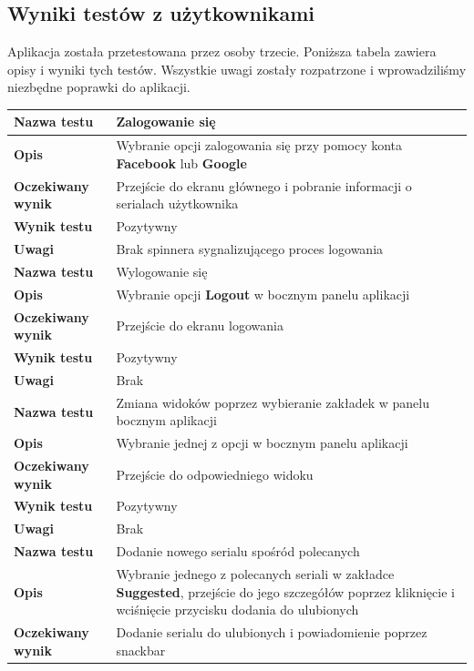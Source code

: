\documentclass[10pt,a4paper]{article}
\begin{document}
\subsection{Wyniki testów z użytkownikami}
Aplikacja została przetestowana przez osoby trzecie. Poniższa tabela zawiera opisy i wyniki tych testów. Wszystkie uwagi zostały rozpatrzone i wprowadziliśmy niezbędne poprawki do aplikacji.

\begin{tabularx}{\textwidth}{|l|X|}
	\hline
	\textbf{Nazwa testu} & Zalogowanie się \\
	\hline
	\textbf{Opis} & Wybranie opcji zalogowania się przy pomocy konta \textbf{Facebook} lub \textbf{Google} \\
	\hline
	\textbf{Oczekiwany wynik} & Przejście do ekranu głównego i pobranie informacji o serialach użytkownika \\
	\hline
	\textbf{Wynik testu} & Pozytywny \\
	\hline
	\textbf{Uwagi} & Brak spinnera sygnalizującego proces logowania \\
	\hhline{==}
	\textbf{Nazwa testu} & Wylogowanie się \\
	\hline
	\textbf{Opis} & Wybranie opcji \textbf{Logout} w bocznym panelu aplikacji \\
	\hline
	\textbf{Oczekiwany wynik} & Przejście do ekranu logowania \\
	\hline
	\textbf{Wynik testu} & Pozytywny \\
	\hline
	\textbf{Uwagi} & Brak \\
	\hhline{==}
	\textbf{Nazwa testu} & Zmiana widoków poprzez wybieranie zakładek w panelu bocznym aplikacji \\
	\hline
	\textbf{Opis} & Wybranie jednej z opcji w bocznym panelu aplikacji \\
	\hline
	\textbf{Oczekiwany wynik} & Przejście do odpowiedniego widoku \\
	\hline
	\textbf{Wynik testu} & Pozytywny \\
	\hline
	\textbf{Uwagi} & Brak \\
	\hhline{==}
	\textbf{Nazwa testu} & Dodanie nowego serialu spośród polecanych \\
	\hline
	\textbf{Opis} & Wybranie jednego z polecanych seriali w zakładce \textbf{Suggested}, przejście do jego szczegółów poprzez kliknięcie i wciśnięcie przycisku dodania do ulubionych \\
	\hline
	\textbf{Oczekiwany wynik} & Dodanie serialu do ulubionych i powiadomienie poprzez snackbar \\

\end{tabularx}
\end{document}
